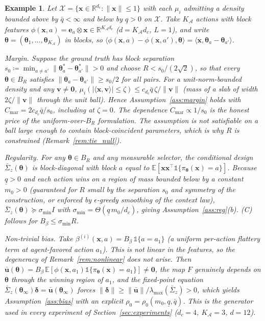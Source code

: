 \documentclass[11pt]{article}
\newtheorem*{example}{Example}
\begin{document}
\begin{example}
Let $\mathcal{X}=\{\bm{x}\in\mathbb{R}^{d_c}:\|\bm{x}\|\leq 1\}$ with
each $\mu_i$ admitting a density bounded above by $\bar q<\infty$ and
below by $\underline q>0$ on $\mathcal{X}$.  Take
$K_{\mathcal{A}}$ actions with block features
$\phi(\bm{x},a)=\bm{e}_a\otimes\bm{x}\in\mathbb{R}^{K_{\mathcal{A}}d_c}$
($d=K_{\mathcal{A}}d_c$, $L=1$), and write
$\bm{\theta}=(\bm{\theta}_1,\dots,\bm{\theta}_{K_{\mathcal{A}}})$ in
blocks, so
$\langle\phi(\bm{x},a)-\phi(\bm{x},a'),\bm{\theta}\rangle
=\langle\bm{x},\bm{\theta}_a-\bm{\theta}_{a'}\rangle$.

\emph{Margin.}  Suppose the ground truth has block separation
$s_0\coloneqq\min_{a\neq a'}\|\bm{\theta}^{\!*}_a-\bm{\theta}^{\!*}_{a'}\|>0$
and choose $R<s_0/(2\sqrt{2})$, so that every $\bm{\theta}\in B_R$
satisfies $\|\bm{\theta}_a-\bm{\theta}_{a'}\|\geq s_0/2$ for all pairs.
For a unit-norm-bounded density and any $\bm{v}\neq\bm 0$,
$\mu_i(|\langle\bm{x},\bm{v}\rangle|\leq\zeta)\leq
c_{d_c}\bar q\,\zeta/\|\bm{v}\|$ (mass of a slab of width
$2\zeta/\|\bm{v}\|$ through the unit ball).  Hence
Assumption~\ref{ass:margin} holds with
$C_{\mathrm{mar}}=2c_{d_c}\bar q/s_0$, including at $\zeta=0$.  The
dependence $C_{\mathrm{mar}}\propto 1/s_0$ is the honest price of the
uniform-over-$B_R$ formulation. The assumption is \emph{not} satisfiable
on a ball large enough to contain block-coincident parameters, which is
why $R$ is constrained (Remark~\ref{rem:tie_null}).

\emph{Regularity.}  For any $\bm{\theta}\in B_R$ and any measurable
selector, the conditional design
$\bar\Sigma_z(\bm{\theta})$ is block-diagonal with block $a$ equal to
$\mathbb{E}[\bm{x}\bm{x}^\top\mathbb{1}\{\pi_{\bm\theta}(\bm{x})=a\}]$.
Because $\underline q>0$ and each action wins on a region of mass
bounded below by a constant $m_0>0$ (guaranteed for $R$ small by the
separation $s_0$ and symmetry of the construction, or enforced by
$\epsilon$-greedy smoothing of the context law),
$\bar\Sigma_z(\bm{\theta})\succeq\sigma_{\min}I$ with
$\sigma_{\min}=\Theta(\underline q\,m_0/d_c)$, giving
Assumption~\ref{ass:reg}(b). (C) follows for
$B_\beta\leq\sigma_{\min}R$.

\emph{Non-trivial bias.}  Take
$\beta^{(i)}(\bm{x},a)=B_\beta\,\mathbb{1}\{a=a_1\}$ (a uniform
per-action flattery term at agent-favored action $a_1$).  This is
\emph{not} linear in the features, so the degeneracy of
Remark~\ref{rem:nonlinear} does not arise. Then
$\bar{\bm{u}}(\bm{\theta})=B_\beta\,
\mathbb{E}[\phi(\bm{x},a_1)\mathbb{1}\{\pi_{\bm\theta}(\bm{x})=a_1\}]
\neq\bm 0$, the map $F$ genuinely depends on $\bm\theta$ through the
winning region of $a_1$, and the fixed-point equation
$\bar\Sigma_z(\bm{\theta}_\infty)\bm{\delta}
=\bar{\bm{u}}(\bm{\theta}_\infty)$ forces
$\|\bm{\delta}\|\geq\|\bar{\bm u}\|/\lambda_{\max}(\bar\Sigma_z)>0$,
which yields Assumption~\ref{ass:bias} with an explicit
$\rho_0=\rho_0(m_0,\underline q,\bar q)$.  This is the generator used
in every experiment of Section~\ref{sec:experiments}
($d_c=4$, $K_{\mathcal{A}}=3$, $d=12$).
\end{example}
\end{document}

